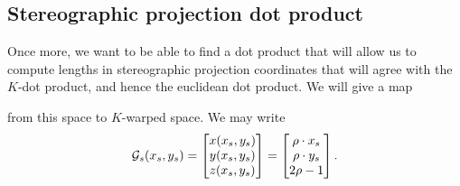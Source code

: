 \documentclass[newpage,hints,handout,12pt,noauthor,nooutcomes]{ximera}
\begin{document}
\subsection{Stereographic projection dot product}

Once more, we want to be able to find a dot product that will allow us
to compute lengths in stereographic projection coordinates that will agree
with the $K$-dot product, and hence the euclidean dot product. We will give a map

\begin{center}
\end{center}
from this space to $K$-warped space. We may write
\[
\mathcal{G}_s(x_s,y_s) = 
\begin{bmatrix}
x(x_s,y_s)  \\
y(x_s,y_s)  \\
z(x_s,y_s)  
\end{bmatrix}
=
\begin{bmatrix}
\rho  \cdot x_s  \\
\rho \cdot y_s  \\
2\rho -1
\end{bmatrix}.
\]
\end{document}
